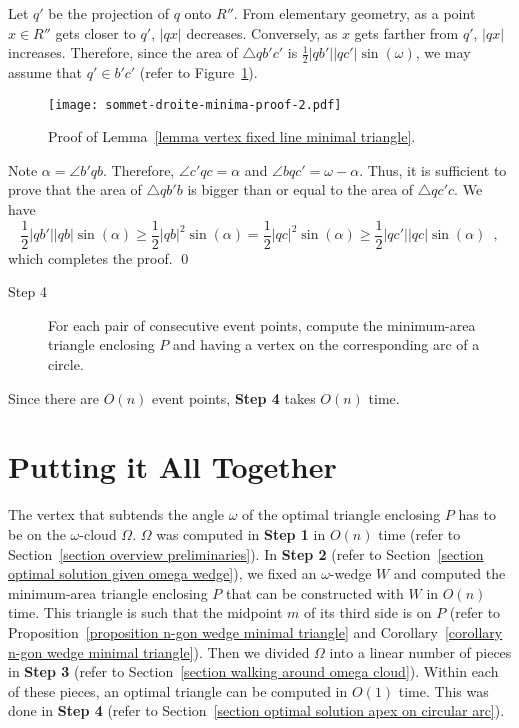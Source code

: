 \documentclass[11pt, oneside]{article}
\begin{document}
Let $q'$ be the projection of $q$ onto $R''$.
From elementary geometry,
as a point $x\in R''$ gets closer to $q'$,
$|qx|$ decreases.
Conversely,
as $x$ gets farther from $q'$,
$|qx|$ increases.
Therefore,
since the area of $\triangle qb'c'$ is $\frac{1}{2}|qb'||qc'|\sin(\omega)$,
we may assume that $q'\in b'c'$
(refer to Figure~\ref{sommet-droite-minima-proof-2}).
\begin{figure}
\centering
\texttt{[image: sommet-droite-minima-proof-2.pdf]}
\caption{Proof of Lemma~\ref{lemma vertex fixed line minimal triangle}.\label{sommet-droite-minima-proof-2}}
\end{figure}
Note $\alpha = \angle b'qb$.
Therefore,
$\angle c'qc = \alpha$
and $\angle bqc' = \omega-\alpha$.
Thus,
it is sufficient to prove that the area of $\triangle qb'b$
is bigger than or equal to the area of $\triangle qc'c$.
We have
$$\frac{1}{2}|qb'||qb|\sin(\alpha) \geq \frac{1}{2}|qb|^2\sin(\alpha) = \frac{1}{2}|qc|^2\sin(\alpha) \geq \frac{1}{2}|qc'||qc|\sin(\alpha) \enspace,$$
which completes the proof.
\qed


\begin{description}
\item[Step 4] For each pair of consecutive event points,
compute the minimum-area triangle enclosing $P$
and having a vertex on the corresponding arc of a circle.
\end{description}

Since there are $O(n)$ event points,
{\bf Step 4} takes $O(n)$ time.




\section{Putting it All Together}
\label{section putting all together}




The vertex that subtends the angle $\omega$ 
of the optimal triangle enclosing $P$
has to be on the $\omega$-cloud $\Omega$.
$\Omega$ was computed in {\bf Step 1}
in $O(n)$ time
(refer to Section~\ref{section overview preliminaries}).
In {\bf Step 2}
(refer to Section~\ref{section optimal solution given omega wedge}),
we fixed an $\omega$-wedge $W$
and computed the minimum-area triangle enclosing $P$
that can be constructed with $W$
in $O(n)$ time.
This triangle is such that
the midpoint $m$ of its third side is on $P$
(refer to Proposition~\ref{proposition n-gon wedge minimal triangle} 
and Corollary~\ref{corollary n-gon wedge minimal triangle}).
Then we divided $\Omega$ into a linear number of pieces
in {\bf Step 3}
(refer to Section~\ref{section walking around omega cloud}).
Within each of these pieces,
an optimal triangle can be computed in $O(1)$ time.
This was done in {\bf Step 4}
(refer to Section~\ref{section optimal solution apex on circular arc}).
\end{document}
